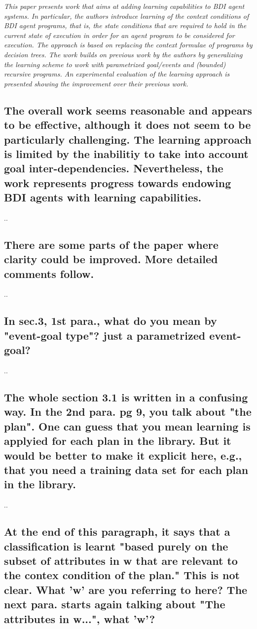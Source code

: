 \documentclass[preprint,12pt]{elsarticle}
\begin{document}
{\em This paper presents work that aims at adding learning capabilities to
BDI agent systems. In particular, the authors introduce learning of
the context conditions of BDI agent programs, that is, the state
conditions that are required to hold in the current state of execution
in order for an agent program to be considered for execution.
The approach is based on replacing the context formulae of programs by
decision trees. The work builds on previous work by the authors by
generalizing the learning scheme to work with parametrized goal/events
and (bounded) recursive programs. An experimental evaluation of the
learning approach is presented showing the improvement over their
previous work.}


\subsection{ The overall work seems reasonable and appears to be effective,
although it does not seem to be particularly challenging. The learning
approach is limited by the inabilitiy to take into account goal
inter-dependencies. Nevertheless, the work represents progress towards
endowing BDI agents with learning capabilities.}

..

\subsection{ There are some parts of the paper where clarity could be
improved. More detailed comments follow.}

..

\subsection{ In sec.3, 1st para., what do you mean by "event-goal type"? just a
parametrized event-goal?}

..

\subsection{ The whole section 3.1 is written in a confusing way.
In the 2nd para. pg 9, you talk about "the plan". One can guess that
you mean learning is applyied for each plan in the library. But it
would be better to make it explicit here, e.g., that you need a
training data set for each plan in the library.}

..

\subsection{ At the end of this paragraph, it says that a classification is learnt
"based purely on the subset of attributes in w that are relevant to
the contex condition of the plan." This is not clear. What 'w' are you
referring to here? The next para. starts again talking about "The
attributes in w...", what 'w'?}
\end{document}
